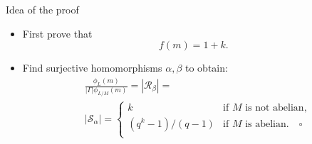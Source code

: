 \documentclass{beamer}
\newcommand{\card}[1]{| #1 |}
\begin{document}
\begin{frame}{Idea of the proof}
    \begin{itemize}
        \item First prove that
        $$
        f(m) = 1 + k.
        $$
        \item <2-> Find surjective homomorphisms $\alpha, \beta$ to obtain:
        \begin{align*}
            &\frac{\phi_L(m)}{\card{\Gamma}\phi_{L/M}(m)} = \card{\mathscr{R}_\beta} = \\
            & \card{\mathscr{S}_{\alpha}} = 
            \begin{cases}
                k & \text{if } M \text{ is not abelian,} \\
                (q^k-1)/(q-1) & \text{if } M \text{ is abelian.} \quad \square \\
            \end{cases}
        \end{align*} 
    \end{itemize}
\end{frame}
\end{document}
